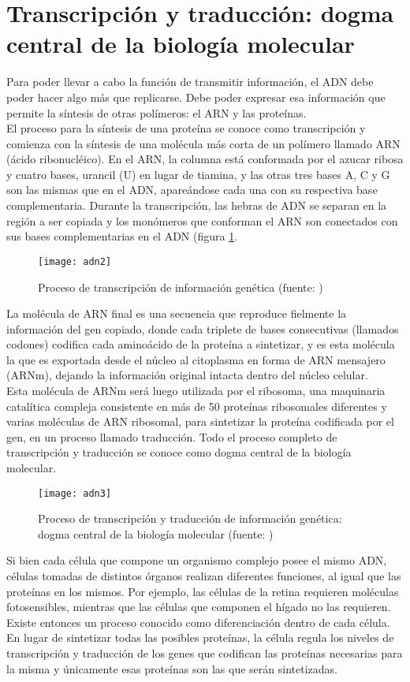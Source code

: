 \section{Transcripción y traducción: dogma central de la biología molecular}
Para poder llevar a cabo la función de transmitir información, el ADN debe poder hacer algo más que replicarse. Debe poder expresar esa información que permite la síntesis de otras polímeros: el ARN y las proteínas.\\
El proceso para la síntesis de una proteína se conoce como transcripción y comienza con la síntesis de una molécula más corta de un polímero llamado ARN (ácido ribonucléico). En el ARN, la columna está conformada por el azucar ribosa y cuatro bases, urancil (U) en lugar de tiamina, y las otras tres bases A, C y G son las mismas que en el ADN, apareándose cada una con su respectiva base complementaria. Durante la transcripción, las hebras de ADN se separan en la región a ser copiada y los monómeros que conforman el ARN son conectados con sus bases complementarias en el ADN (figura \ref{fig:adn2}. 
\begin{figure}[h]
    \centering
    \texttt{[image: adn2]}
    \caption{Proceso de transcripción de información genética (fuente: \cite{Alberts2015})}
    \label{fig:adn2}
\end{figure}
La molécula de ARN final es una secuencia que reproduce fielmente la información del gen copiado, donde cada triplete de bases consecutivas (llamados codones) codifica cada aminoácido de la proteína a sintetizar, y es esta molécula la que es exportada desde el núcleo al citoplasma en forma de ARN mensajero (ARNm), dejando la información original intacta dentro del núcleo celular.\\
Esta molécula de ARNm será luego utilizada por el ribosoma, una maquinaria catalítica compleja consistente en más de 50 proteínas ribosomales diferentes y varias moléculas de ARN ribosomal, para sintetizar la proteína codificada por el gen, en un proceso llamado traducción. Todo el proceso completo de transcripción y traducción se conoce como dogma central de la biología molecular.
\begin{figure}[h]
    \centering
    \texttt{[image: adn3]}
    \caption{Proceso de transcripción y traducción de información genética: dogma central de la biología molecular (fuente: \cite{Alberts2015})}
    \label{fig:adn3}
\end{figure}
Si bien cada célula que compone un organismo complejo posee el mismo ADN, células tomadas de distintos órganos realizan diferentes funciones, al igual que las proteínas en los mismos. Por ejemplo, las células de la retina requieren moléculas fotosensibles, mientras que las células que componen el hígado no las requieren. Existe entonces un proceso conocido como diferenciación dentro de cada célula. En lugar de sintetizar todas las posibles proteínas, la célula regula los niveles de transcripción y traducción de los genes que codifican las proteínas necesarias para la misma y únicamente esas proteínas son las que serán sintetizadas.\\
